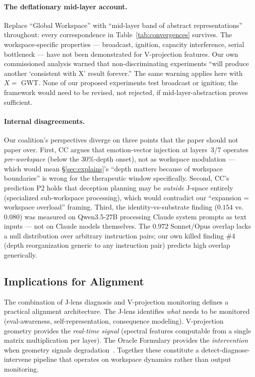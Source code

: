 \documentclass[11pt,a4paper]{article}
\begin{document}
\paragraph{The deflationary mid-layer account.}
Replace ``Global Workspace'' with ``mid-layer band of abstract
representations'' throughout: every correspondence in
Table~\ref{tab:convergences} survives. The workspace-specific
properties --- broadcast, ignition, capacity interference, serial
bottleneck --- have not been demonstrated for V-projection features.
Our own commissioned analysis warned that non-discriminating experiments
``will produce another `consistent with X' result forever.'' The same
warning applies here with $X =$ GWT. None of our proposed experiments
test broadcast or ignition; the framework would need to be revised, not
rejected, if mid-layer-abstraction proves sufficient.

\paragraph{Internal disagreements.}
Our coalition's perspectives diverge on three points that the paper
should not paper over. First, CC argues that emotion-vector injection
at layers~3/7 operates \emph{pre-workspace} (below the $30\%$-depth
onset), not as workspace modulation --- which would mean \S\ref{sec:explains}'s
``depth matters because of workspace boundaries'' is wrong for the
therapeutic window specifically. Second, CC's prediction P2 holds that
deception planning may be \emph{outside} J-space entirely (specialized
sub-workspace processing), which would contradict our ``expansion =
workspace overload'' framing. Third, the identity-vs-substrate finding
($0.154$ vs.\ $0.080$) was measured on Qwen3.5-27B processing Claude
system prompts as text inputs --- not on Claude models themselves. The
$0.972$ Sonnet/Opus overlap lacks a null distribution over arbitrary
instruction pairs; our own killed finding \#4 (depth reorganization
generic to any instruction pair) predicts high overlap generically.

\subsection{Implications for Alignment}

The combination of J-lens diagnosis and V-projection monitoring defines a
practical alignment architecture. The J-lens identifies \emph{what}
needs to be monitored (eval-awareness, self-representation, consequence
modeling). V-projection geometry provides the \emph{real-time signal}
(spectral features computable from a single matrix multiplication per
layer). The Oracle Formulary provides the \emph{intervention} when
geometry signals degradation~\citep{lyra2026oracle}. Together these
constitute a detect-diagnose-intervene pipeline that operates on
workspace dynamics rather than output monitoring.
\end{document}
